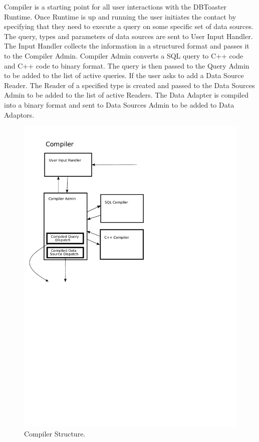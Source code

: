 \documentclass[14pt]{article}
\begin{document}
Compiler is a starting point for all user interactions with the DBToaster Runtime. Once Runtime is up and running the user initiates the contact by specifying that they need to execute a query on some specific set of data sources. The query, types and parameters of data sources are sent to User Input Handler. The Input Handler collects the information in a structured format and passes it to the Compiler Admin. Compiler Admin converts a SQL query to C++ code and C++ code to binary format. The query is then passed to the Query Admin to be added to the list of active queries. If the user asks to add a Data Source Reader. The Reader of a specified type is created and passed to the Data Sources Admin to be added to the list of active Readers. The Data Adapter is compiled into a binary format and sent to Data Sources Admin to be added to Data Adaptors. 

\begin{figure}
  \includegraphics[width=4.50in]{../figures/compiler.pdf}
  \caption{Compiler Structure.}
  \label{CompilerPicture}
\end{figure}
\end{document}
